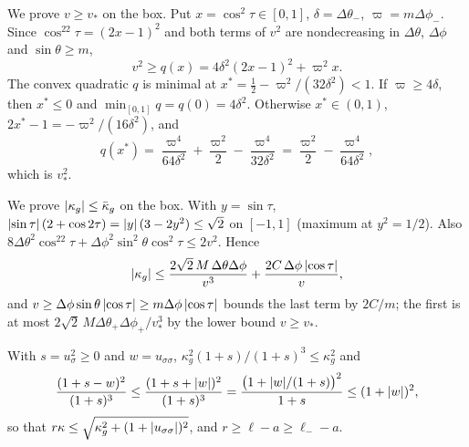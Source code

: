 We prove \(v\ge v_*\) on the box.
Put \(x = \cos^2\tau\in[0,1]\), \(\delta = \Delta\theta_-\), \(\varpi = m\Delta\phi_-\).
Since \(\cos^22\tau = (2x-1)^2\) and both terms of \(v^2\) are nondecreasing in \(\Delta\theta\), \(\Delta\phi\) and \(\sin\theta\ge m\),
\begin{equation}
    v^2 \ge q(x) = 4\delta^2(2x-1)^2 + \varpi^2 x .
\end{equation}
The convex quadratic \(q\) is minimal at \(x^* = \tfrac12 - \varpi^2/(32\delta^2) < 1\).
If \(\varpi\ge4\delta\), then \(x^*\le0\) and \(\min_{[0,1]}q = q(0) = 4\delta^2\).
Otherwise \(x^*\in(0,1)\), \(2x^*-1 = -\varpi^2/(16\delta^2)\), and
\begin{equation}
    q(x^*) = \frac{\varpi^4}{64\delta^2} + \frac{\varpi^2}2 - \frac{\varpi^4}{32\delta^2} = \frac{\varpi^2}2 - \frac{\varpi^4}{64\delta^2},
\end{equation}
which is \(v_*^2\).

We prove \(\abs{\kappa_g}\le\bar\kappa_g\) on the box.
With \(y = \sin\tau\), \(\abs{\sin\tau}\,(2+\cos2\tau) = \abs{y}\,(3-2y^2)\le\sqrt2\) on \([-1,1]\) (maximum at \(y^2 = 1/2\)).
Also \(8\Delta\theta^2\cos^22\tau + \Delta\phi^2\sin^2\theta\cos^2\tau\le2v^2\).
Hence
\begin{equation}
    \abs{\kappa_g} \le \frac{2\sqrt2\,M\,\Delta\theta\Delta\phi}{v^3} + \frac{2C\,\Delta\phi\,\abs{\cos\tau}}{v},
\end{equation}
and \(v\ge\Delta\phi\sin\theta\,\abs{\cos\tau}\ge m\Delta\phi\,\abs{\cos\tau}\) bounds the last term by \(2C/m\); the first is at most \(2\sqrt2\,M\Delta\theta_+\Delta\phi_+/v_*^3\) by the lower bound \(v\ge v_*\).

With \(s = u_\sigma^2\ge0\) and \(w = u_{\sigma\sigma}\), \(\kappa_g^2(1+s)/(1+s)^3\le\kappa_g^2\) and
\begin{equation}
    \frac{(1+s-w)^2}{(1+s)^3} \le \frac{(1+s+\abs{w})^2}{(1+s)^3} = \frac{\bigl(1+\abs{w}/(1+s)\bigr)^2}{1+s} \le (1+\abs{w})^2,
\end{equation}
so that \(r\kappa\le\sqrt{\kappa_g^2 + (1+\abs{u_{\sigma\sigma}})^2}\), and \(r\ge\ell-a\ge\ell_--a\).

